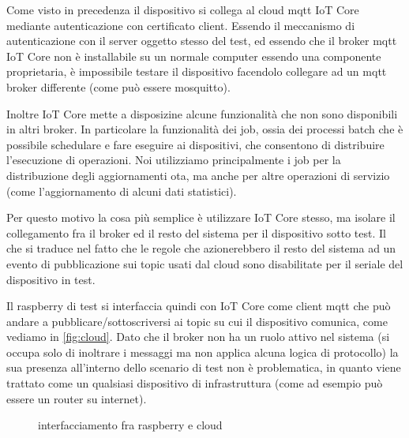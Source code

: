 \documentclass[12pt,a4paper,twoside,titlepage]{book}
\begin{document}
Come visto in precedenza il dispositivo si collega al cloud \Gls{mqtt} IoT Core mediante
autenticazione con certificato client. Essendo il meccanismo di autenticazione con il
server oggetto stesso del test, ed essendo che il broker \Gls{mqtt} IoT Core non è installabile
su un normale computer essendo una componente proprietaria, è impossibile testare il
dispositivo facendolo collegare ad un \Gls{mqtt} broker differente (come può essere mosquitto).

Inoltre IoT Core mette a disposizine alcune funzionalità che non sono disponibili in
altri broker. In particolare la funzionalità dei job, ossia dei processi batch che è
possibile schedulare e fare eseguire ai dispositivi, che consentono di distribuire l'esecuzione
di operazioni. Noi utilizziamo principalmente i job per la distribuzione degli aggiornamenti \acrshort{ota},
ma anche per altre operazioni di servizio (come l'aggiornamento di alcuni dati statistici).

Per questo motivo la cosa più semplice è utilizzare IoT Core stesso, ma isolare il collegamento
fra il broker ed il resto del sistema per il dispositivo sotto test. Il che si traduce nel
fatto che le regole che azionerebbero il resto del sistema ad un evento di pubblicazione
sui \gls{topic} usati dal cloud sono disabilitate per il seriale del dispositivo in test.

Il raspberry di test si interfaccia quindi con IoT Core come client \Gls{mqtt} che può
andare a pubblicare/sottoscriversi ai \gls{topic} su cui il dispositivo comunica, come vediamo in \autoref{fig:cloud}.
Dato che il broker non ha un ruolo attivo nel sistema (si occupa solo di inoltrare i messaggi ma non
applica alcuna logica di protocollo) la sua presenza all'interno dello scenario di test non
è problematica, in quanto viene trattato come un qualsiasi dispositivo di infrastruttura
(come ad esempio può essere un router su internet).

\begin{figure}[h]
    \centering
    \caption{interfacciamento fra raspberry e cloud}
    \label{fig:cloud}
\end{figure}
\end{document}

